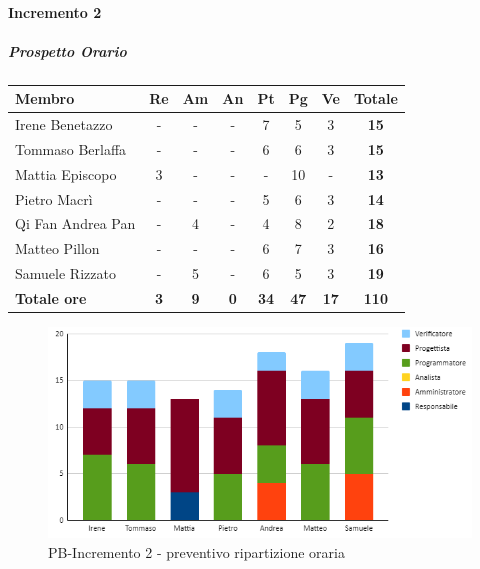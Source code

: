 \paragraph{Incremento 2}
\subparagraph{Prospetto Orario}
\begin{center}
	\renewcommand{\arraystretch}{1.8} %
	\begin{tabular}{ |m{10em}|c|c|c|c|c|c|c| }
	\hline
	\textbf{Membro} & \textbf{Re} & \textbf{Am} &  \textbf{An} &  \textbf{Pt} &  \textbf{Pg} &  \textbf{Ve} &  \textbf{Totale}\\
    \hline
    Irene Benetazzo   & - & - & - & 7 & 5 & 3 & \textbf{15} \\
    \hline
    Tommaso Berlaffa  & - & - & - & 6 & 6 & 3 & \textbf{15} \\
    \hline
    Mattia Episcopo   & 3 & - & - & - & 10 & - & \textbf{13} \\
    \hline
    Pietro Macrì      & - & - & - & 5 & 6 & 3 & \textbf{14} \\
    \hline
    Qi Fan Andrea Pan & - & 4 & - & 4 & 8 & 2 & \textbf{18} \\
    \hline
    Matteo Pillon     & - & - & - & 6 & 7 & 3 & \textbf{16} \\
    \hline
    Samuele Rizzato   & - & 5 & - & 6 & 5 & 3 & \textbf{19} \\
    \hline
    \textbf{Totale ore} & \textbf{3} & \textbf{9} &  \textbf{0} &  \textbf{34} &  \textbf{47} &  \textbf{17} &  \textbf{110}\\
    \hline
	\end{tabular}
\end{center}
\begin{figure}[H]
   \centering\includegraphics{images/preventivo/PB-incremento2-ore.png}
   \caption{PB-Incremento 2 - preventivo ripartizione oraria}
\end{figure}

